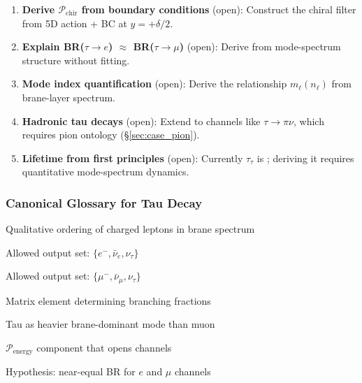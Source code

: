 \begin{enumerate}[nosep]
    \item \textbf{Derive $\mathcal{P}_{\mathrm{chir}}$ from boundary conditions}
          (open): Construct the chiral filter from 5D action + BC at
          $y = +\delta/2$.

    \item \textbf{Explain BR($\tau \to e$) $\approx$ BR($\tau \to \mu$)}
          (open): Derive from mode-spectrum structure without fitting.

    \item \textbf{Mode index quantification} (open): Derive the
          relationship $m_\ell(n_\ell)$ from brane-layer spectrum.

    \item \textbf{Hadronic tau decays} (open): Extend to channels like
          $\tau \to \pi\nu$, which requires pion ontology (\S\ref{sec:case_pion}).

    \item \textbf{Lifetime from first principles} (open): Currently
          $\tau_\tau$ is \tagBL{}; deriving it requires quantitative
          mode-spectrum dynamics.
\end{enumerate}


\subsubsection{Canonical Glossary for Tau Decay}

\begin{tcolorbox}[edcCanonical, title=\textbf{Canonical Terms: Tau Decay Pipeline}]
\begin{description}[nosep, leftmargin=!, labelwidth=4cm]
\item[Mode index $n_\ell$] Qualitative ordering of charged leptons in brane spectrum
\item[$\mathcal{A}_{\tau \to e}$] Allowed output set: $\{e^-, \bar{\nu}_e, \nu_\tau\}$
\item[$\mathcal{A}_{\tau \to \mu}$] Allowed output set: $\{\mu^-, \bar{\nu}_\mu, \nu_\tau\}$
\item[Spectral overlap] Matrix element determining branching fractions
\item[Higher-mode excitation] Tau as heavier brane-dominant mode than muon
\item[Threshold gate] $\mathcal{P}_{\mathrm{energy}}$ component that opens channels
\item[Democratic branching] Hypothesis: near-equal BR for $e$ and $\mu$ channels
\end{description}
\end{tcolorbox}

